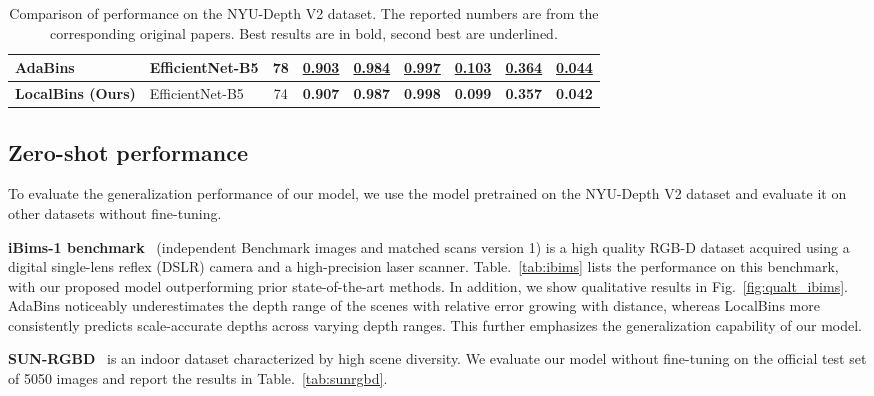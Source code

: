 \documentclass[runningheads]{llncs}
\begin{document}
\begin{table}[t]
\begin{adjustbox}{width=\linewidth,center}
\begin{tabularx}{\linewidth}{@{}l|lS|*{5}{C}c@{}}
AdaBins~\cite{Bhat2021} & EfficientNet-B5 & 78 & \underline{0.903} & \underline{0.984} & \underline{0.997} & \underline{0.103}     & \underline{0.364} & \underline{0.044} \\ 

\midrule
\textbf{LocalBins (Ours)}  & EfficientNet-B5 & 74 & \textbf{0.907} & \textbf{0.987} & \textbf{0.998} & \textbf{0.099}     & \textbf{0.357} & \textbf{0.042} \\ 
\bottomrule
\end{tabularx}
\end{adjustbox}
\caption{Comparison of performance on the NYU-Depth V2 dataset. The reported numbers are from the corresponding original papers. Best results are in bold, second best are underlined. }
\label{tab:results-nyu}
\end{table}

\subsection{Zero-shot performance}
To evaluate the generalization performance of our model, we use the model pretrained on the NYU-Depth V2 dataset and evaluate it on other datasets without fine-tuning.

\textbf{iBims-1 benchmark}~\cite{koch2019} (independent Benchmark images and matched scans version 1) is a high quality RGB-D dataset
acquired using a digital single-lens reflex (DSLR) camera and a high-precision laser scanner. Table.~\ref{tab:ibims} lists the performance on this benchmark, with our proposed model outperforming prior state-of-the-art methods. In addition, we show qualitative results in Fig.~\ref{fig:qualt_ibims}. AdaBins noticeably underestimates the depth range of the scenes with relative error growing with distance, whereas LocalBins more consistently predicts scale-accurate depths across varying depth ranges. This further emphasizes the generalization capability of our model.

\textbf{SUN-RGBD}~\cite{Song2015_sunrgbd} is an indoor dataset characterized by high scene diversity. We evaluate our model without fine-tuning on the official test set of 5050 images and report the results in Table.~\ref{tab:sunrgbd}.
\end{document}
